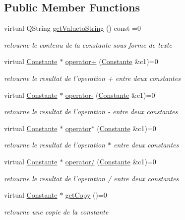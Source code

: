 \subsection*{Public Member Functions}
\begin{DoxyCompactItemize}
\item 
virtual Q\-String \hyperlink{class_constante_a93d89080856c972bdebc3619fc957f52}{get\-Valueto\-String} () const =0
\begin{DoxyCompactList}\small\item\em retourne le contenu de la constante sous forme de texte \end{DoxyCompactList}\item 
virtual \hyperlink{class_constante}{Constante} $\ast$ \hyperlink{class_constante_ae1c9e9fa9b3272e37bdb292509741831}{operator+} (\hyperlink{class_constante}{Constante} \&c1)=0
\begin{DoxyCompactList}\small\item\em retourne le resultat de l'operation + entre deux constantes \end{DoxyCompactList}\item 
virtual \hyperlink{class_constante}{Constante} $\ast$ \hyperlink{class_constante_a9d0df3d484c2d87556cb4faa73606862}{operator-\/} (\hyperlink{class_constante}{Constante} \&c1)=0
\begin{DoxyCompactList}\small\item\em retourne le resultat de l'operation -\/ entre deux constantes \end{DoxyCompactList}\item 
virtual \hyperlink{class_constante}{Constante} $\ast$ \hyperlink{class_constante_ae7c4cf6a493277ec98ae346e13bbf82a}{operator$\ast$} (\hyperlink{class_constante}{Constante} \&c1)=0
\begin{DoxyCompactList}\small\item\em retourne le resultat de l'operation $\ast$ entre deux constantes \end{DoxyCompactList}\item 
virtual \hyperlink{class_constante}{Constante} $\ast$ \hyperlink{class_constante_af83c6680a11bc9ca5db49a32864151dd}{operator/} (\hyperlink{class_constante}{Constante} \&c1)=0
\begin{DoxyCompactList}\small\item\em retourne le resultat de l'operation / entre deux constantes \end{DoxyCompactList}\item 
virtual \hyperlink{class_constante}{Constante} $\ast$ \hyperlink{class_constante_addd94a5006b4ed68cc0d1d7b5864e10a}{get\-Copy} ()=0
\begin{DoxyCompactList}\small\item\em retourne une copie de la constante \end{DoxyCompactList}\end{DoxyCompactItemize}


